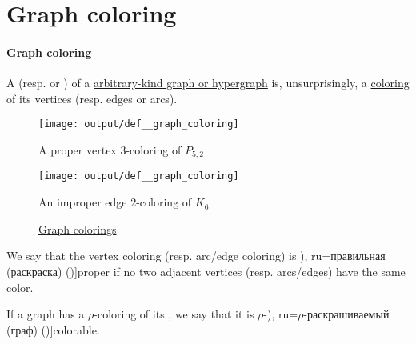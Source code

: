 \section{Graph coloring}\label{sec:graph_coloring}

\paragraph{Graph coloring}

\begin{definition}\label{def:graph_coloring}
  A  (resp.  or ) of a \hyperref[rem:arbitrary_kind_graph]{arbitrary-kind graph or hypergraph} is, unsurprisingly, a \hyperref[def:set_coloring]{coloring} of its vertices (resp. edges or arcs).

  \begin{figure}[!ht]
    \begin{subcaptionblock}{0.5\textwidth}
      \centering
      \texttt{[image: output/def\_\_graph\_coloring]}
      \caption{A proper vertex \( 3 \)-coloring of \hyperref[def:petersen_graph]{\( P_{5,2} \)}}\label{fig:def:graph_coloring/petersen}
    \end{subcaptionblock}
    \hfill
    \begin{subcaptionblock}{0.5\textwidth}
      \centering
      \texttt{[image: output/def\_\_graph\_coloring]}
      \caption{An improper edge \( 2 \)-coloring of \hyperref[def:complete_graph]{\( K_6 \)}}\label{fig:def:graph_coloring/triangle}
    \end{subcaptionblock}
    \caption{\hyperref[def:graph_coloring]{Graph colorings}}\label{fig:def:graph_coloring}
  \end{figure}

  \begin{thmenum}
     We say that the vertex coloring (resp. arc/edge coloring) is \term[bg=правилно (оцветяване) (\cite[141]{Мирчев2001Графи}), ru=правильная (раскраска) (\cite[306]{ЕмеличевИПр1990Графы})]{proper} if no two adjacent vertices (resp. arcs/edges) have the same color.

     If a graph has a \( \rho \)-coloring of its , we say that it is \( \rho \)-\term[bg=\( \rho \)-оцветим (граф) (\cite[141]{Мирчев2001Графи}), ru=\( \rho \)-раскрашиваемый (граф) (\cite[\S 53]{ЕмеличевИПр1990Графы})]{colorable}.
  \end{thmenum}
\end{definition}
